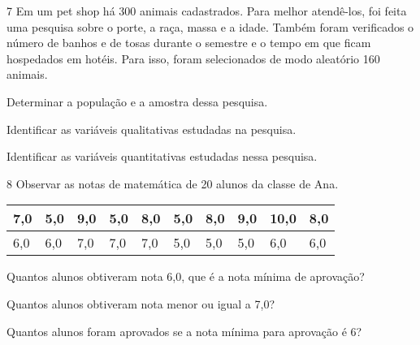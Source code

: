 {


\num{7} Em um pet shop há 300 animais cadastrados. Para melhor atendê-los,
foi feita uma pesquisa sobre o porte, a raça, massa e a idade. Também
foram verificados o número de banhos e de tosas durante o semestre e o
tempo em que ficam hospedados em hotéis. Para isso, foram selecionados
de modo aleatório 160 animais.

\begin{escolha}
\item
  Determinar a população e a amostra dessa pesquisa.


\item
  Identificar as variáveis qualitativas estudadas na pesquisa.


\item
  Identificar as variáveis quantitativas estudadas nessa pesquisa.

\end{escolha}


\num{8} Observar as notas de matemática de 20 alunos da classe de Ana.

\begin{longtable}[]{@{}llllllllll@{}}
\toprule
7,0 & 5,0 & 9,0 & 5,0 & 8,0 & 5,0 & 8,0 & 9,0 & 10,0 &
8,0\tabularnewline
\midrule
\endhead
6,0 & 6,0 & 7,0 & 7,0 & 7,0 & 5,0 & 5,0 & 5,0 & 6,0 & 6,0\tabularnewline
\bottomrule
\end{longtable}

\begin{escolha}
\item
  Quantos alunos obtiveram nota 6,0, que é a nota mínima de aprovação?


\item
  Quantos alunos obtiveram nota menor ou igual a 7,0?


\item
  Quantos alunos foram aprovados se a nota mínima para aprovação é 6?

\end{escolha}

}
